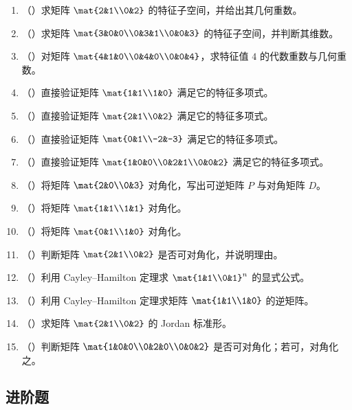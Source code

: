 \begin{enumerate}[label=\arabic*., leftmargin=2.8em]
  \item （\basic）求矩阵 \(\mat{2&1\\0&2}\) 的特征子空间，并给出其几何重数。
  \item （\basic）求矩阵 \(\mat{3&0&0\\0&3&1\\0&0&3}\) 的特征子空间，并判断其维数。
  \item （\basic）对矩阵 \(\mat{4&1&0\\0&4&0\\0&0&4}\)，求特征值 \(4\) 的代数重数与几何重数。
  \item （\basic）直接验证矩阵 \(\mat{1&1\\1&0}\) 满足它的特征多项式。
  \item （\basic）直接验证矩阵 \(\mat{2&1\\0&2}\) 满足它的特征多项式。
  \item （\basic）直接验证矩阵 \(\mat{0&1\\-2&-3}\) 满足它的特征多项式。
  \item （\basic）直接验证矩阵 \(\mat{1&0&0\\0&2&1\\0&0&2}\) 满足它的特征多项式。
  \item （\basic）将矩阵 \(\mat{2&0\\0&3}\) 对角化，写出可逆矩阵 \(P\) 与对角矩阵 \(D\)。
  \item （\basic）将矩阵 \(\mat{1&1\\1&1}\) 对角化。
  \item （\basic）将矩阵 \(\mat{0&1\\1&0}\) 对角化。
  \item （\basic）判断矩阵 \(\mat{2&1\\0&2}\) 是否可对角化，并说明理由。
  \item （\basic）利用 Cayley--Hamilton 定理求 $\mat{1&1\\0&1}^n$ 的显式公式。
  \item （\basic）利用 Cayley--Hamilton 定理求矩阵 \(\mat{1&1\\1&0}\) 的逆矩阵。
  \item （\basic）求矩阵 \(\mat{2&1\\0&2}\) 的 Jordan 标准形。
  \item （\basic）判断矩阵 \(\mat{1&0&0\\0&2&0\\0&0&2}\) 是否可对角化；若可，对角化之。
\end{enumerate}

\subsection*{进阶题}

